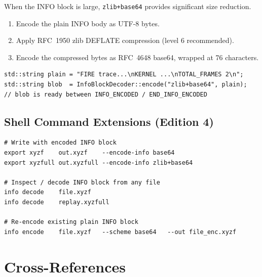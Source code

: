 \documentclass[12pt, a4paper, oneside]{article}
\begin{document}
When the INFO block is large, \texttt{zlib+base64} provides significant
size reduction.

\begin{enumerate}
  \item Encode the plain INFO body as UTF-8 bytes.
  \item Apply RFC~1950 zlib DEFLATE compression (level 6 recommended).
  \item Encode the compressed bytes as RFC~4648 base64, wrapped at 76 characters.
\end{enumerate}

\begin{lstlisting}
std::string plain = "FIRE trace...\nKERNEL ...\nTOTAL_FRAMES 2\n";
std::string blob  = InfoBlockDecoder::encode("zlib+base64", plain);
// blob is ready between INFO_ENCODED / END_INFO_ENCODED
\end{lstlisting}

\subsection{Shell Command Extensions (Edition 4)}

\begin{lstlisting}[language={},frame=single]
# Write with encoded INFO block
export xyzf    out.xyzf    --encode-info base64
export xyzfull out.xyzfull --encode-info zlib+base64

# Inspect / decode INFO block from any file
info decode    file.xyzf
info decode    replay.xyzfull

# Re-encode existing plain INFO block
info encode    file.xyzf   --scheme base64   --out file_enc.xyzf
\end{lstlisting}

\section{Cross-References}
\end{document}
